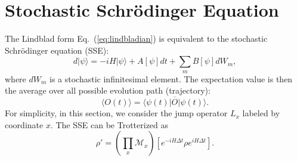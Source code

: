 \documentclass{SciPost}
\begin{document}
\section{Stochastic Schr\"{o}dinger Equation}

The Lindblad form Eq.~(\ref{eq:lindbladian}) is equivalent to the stochastic Schr\"{o}dinger equation (SSE):
\begin{equation}
	d|\psi\rangle = -iH|\psi\rangle + A[\psi]dt + \sum_m B[\psi]dW_m,
\end{equation}
where $dW_m$ is a stochastic infinitesimal element. The expectation value is then the average over all possible evolution path (trajectory): 
$$\langle O(t) \rangle = \overline{\langle\psi(t)|O|\psi(t)\rangle}.$$
For simplicity, in this section, we consider the jump operator $L_x$ labeled by coordinate $x$. 
The SSE can be Trotterized as
\begin{equation}
	\rho' = \left(\prod_x \mathcal{M}_{x} \right) \left[e^{-iH\Delta t} \rho e^{iH\Delta t}\right].
\end{equation}
\end{document}
